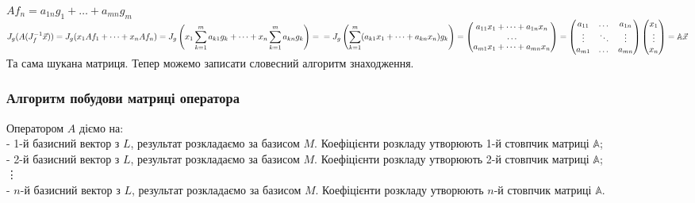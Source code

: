 \documentclass[a4paper, 10pt]{article}
\def\huge{\displaystyle}
\theoremstyle{theoremdd}
\theoremstyle{theoremdd}
\theoremstyle{theoremdd}
\theoremstyle{theoremdd}
\theoremstyle{theoremdd}
\theoremstyle{theoremdd}
\theoremstyle{theoremdd}
\theoremstyle{theoremdd}
\begin{document}
	$Af_n = a_{1n}g_1 + \dots + a_{mn}g_m$\\
	$J_g(A(J_f^{-1}\vec{x})) = J_g(x_1Af_1 + \dots + x_nAf_n) = \huge J_g\left(x_1 \sum_{k=1}^m a_{k1}g_k + \dots + x_n \sum_{k=1}^m a_{kn}g_k\right) = \\ = J_g\left(\sum_{k=1}^m (a_{k1}x_1 + \dots + a_{kn}x_n)g_k \right) = \begin{pmatrix}
	a_{11}x_1 + \dots + a_{1n}x_n \\
	\dots \\
	a_{m1}x_1 + \dots + a_{mn}x_n \\
	\end{pmatrix} = \begin{pmatrix}
	a_{11} & \dots & a_{1n} \\
	\vdots & \ddots & \vdots \\
	a_{m1} & \dots & a_{mn}
	\end{pmatrix} \begin{pmatrix}
	x_1 \\ \vdots \\ x_n
	\end{pmatrix} = \mathbb{A}\vec{x}$\\
	Та сама шукана матриця. Тепер можемо записати словесний алгоритм знаходження.
	
	\subsubsection*{Алгоритм побудови матриці оператора}
	Оператором $A$ діємо на:\\
	- 1-й базисний вектор з $L$, результат розкладаємо за базисом $M$. Коефіцієнти розкладу утворюють 1-й стовпчик матриці $\mathbb{A}$;\\
	- 2-й базисний вектор з $L$, результат розкладаємо за базисом $M$. Коефіцієнти розкладу утворюють 2-й стовпчик матриці $\mathbb{A}$;\\
	\vdots \\
	- $n$-й базисний вектор з $L$, результат розкладаємо за базисом $M$. Коефіцієнти розкладу утворюють $n$-й стовпчик матриці $\mathbb{A}$.
	
\end{document}
